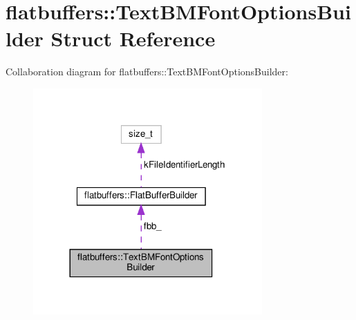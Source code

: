 \hypertarget{structflatbuffers_1_1TextBMFontOptionsBuilder}{}\section{flatbuffers\+:\+:Text\+B\+M\+Font\+Options\+Builder Struct Reference}
\label{structflatbuffers_1_1TextBMFontOptionsBuilder}


Collaboration diagram for flatbuffers\+:\+:Text\+B\+M\+Font\+Options\+Builder\+:
\nopagebreak
\begin{figure}[H]
\begin{center}
\leavevmode
\includegraphics[width=248pt]{structflatbuffers_1_1TextBMFontOptionsBuilder__coll__graph}
\end{center}
\end{figure}
